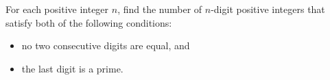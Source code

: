 For each positive integer $n$, find the number of $n$-digit positive integers that satisfy both of the following conditions:
\begin{itemize}
	\item no two consecutive digits are equal, and
	\item the last digit is a prime.
\end{itemize}